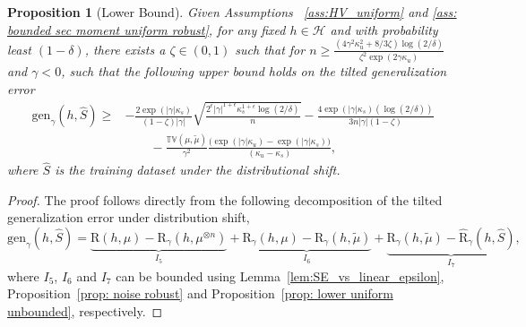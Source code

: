 \documentclass{article}
\theoremstyle{plain}
\theoremstyle{plain}
\newtheorem{proposition}[theorem]{Proposition}
\theoremstyle{definition}
\theoremstyle{remark}
\newcommand{\RTERM}{\widehat{\mathrm{R}}_{\gamma}}
\newcommand{\RTrue}{\mathrm{R}}
\newcommand{\RTET}{\mathrm{R}_{\gamma}}
\begin{document}
\begin{tcolorbox}
\begin{proposition}[Lower Bound]\label{prop:robust_lower}
    Given Assumptions~ \ref{ass:HV_uniform} and \ref{ass: bounded sec moment uniform robust}, for any fixed $h\in\mathcal{H}$ and with probability least $(1-\delta)$, there exists a $\zeta\in(0,1)$ such that for $n\geq \frac{(4\gamma^2\kappa_u^2+8/3 \zeta )\log(2/\delta)}{\zeta^2\exp(2\gamma \kappa_u)}$ and $\gamma<0$, such that the following upper bound holds on the tilted generalization error
     \begin{equation*}
    \begin{split}
      \mathrm{gen}_{\gamma}(h,\hat{S})\geq& -\frac{2\exp(|\gamma| \kappa_s)}{(1-\zeta)|\gamma|}\sqrt{\frac{2^{\epsilon}|\gamma|^{1+\epsilon}\kappa_s^{1+\epsilon}\log(2/\delta)}{n}} -\frac{4\exp(|\gamma| \kappa_s)(\log(2/\delta))}{3n|\gamma|(1-\zeta)}\\
      & \quad \quad  -\frac{\mathbb{TV}(\mu,\tilde{\mu})}{\gamma^2 }\frac{\big(\exp(|\gamma|\kappa_u)-\exp(|\gamma|\kappa_s)\big)}{(\kappa_u-\kappa_s)},
      \end{split}
    \end{equation*}
    where $\hat{S}$ is the training dataset under the distributional shift.
\end{proposition}
\end{tcolorbox}

\begin{proof}
    The proof follows directly from the following decomposition of the tilted generalization error under distribution shift,
    \[ \mathrm{gen}_{\gamma}(h,\hat{S})=\underbrace{\RTrue(h,\mu)- \RTET(h,\mu^{\otimes n})}_{I_5}+ 
    \underbrace{\RTET(h,\mu)-\RTET(h,\tilde{\mu})}_{I_6}+\underbrace{\RTET(h,\tilde{\mu})-\RTERM(h,\hat{S})}_{I_7},\]
    where $I_5$, $I_6$ and $I_7$ can be bounded using Lemma~\ref{lem:SE_vs_linear_epsilon}, Proposition~\ref{prop: noise robust} and Proposition~\ref{prop: lower uniform unbounded}, respectively.
\end{proof}
\end{document}
